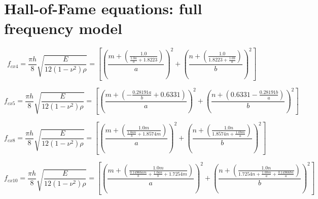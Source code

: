 \documentclass[11pt]{article}
\begin{document}
\section*{Hall-of-Fame equations: full frequency model}


\begin{equation}
\label{eq:cx4}
f_{cx4} = \frac{\pi h}{8}\sqrt{\frac{E}{12(1-\nu^{2})\rho}} = \left[\left(\frac{m + \left(\frac{1.0}{\frac{1.0 a}{b} + 1.8223}\right)}{a}\right)^{2} + \left(\frac{n + \left(\frac{1.0}{1.8223 + \frac{1.0 b}{a}}\right)}{b}\right)^{2}\right]
\end{equation}

\begin{equation}
\label{eq:cx5}
f_{cx5} = \frac{\pi h}{8}\sqrt{\frac{E}{12(1-\nu^{2})\rho}} = \left[\left(\frac{m + \left(- \frac{0.28191 a}{b} + 0.6331\right)}{a}\right)^{2} + \left(\frac{n + \left(0.6331 - \frac{0.28191 b}{a}\right)}{b}\right)^{2}\right]
\end{equation}

\begin{equation}
\label{eq:cx8}
f_{cx8} = \frac{\pi h}{8}\sqrt{\frac{E}{12(1-\nu^{2})\rho}} = \left[\left(\frac{m + \left(\frac{1.0 m}{\frac{1.0 a n}{b} + 1.8574 m}\right)}{a}\right)^{2} + \left(\frac{n + \left(\frac{1.0 n}{1.8574 n + \frac{1.0 b m}{a}}\right)}{b}\right)^{2}\right]
\end{equation}

\begin{equation}
\label{eq:cx10}
f_{cx10} = \frac{\pi h}{8}\sqrt{\frac{E}{12(1-\nu^{2})\rho}} = \left[\left(\frac{m + \left(\frac{1.0 m}{\frac{0.14966 a m}{b} + \frac{1.0 a n}{b} + 1.7254 m}\right)}{a}\right)^{2} + \left(\frac{n + \left(\frac{1.0 n}{1.7254 n + \frac{1.0 b m}{a} + \frac{0.14966 b n}{a}}\right)}{b}\right)^{2}\right]
\end{equation}
\end{document}
